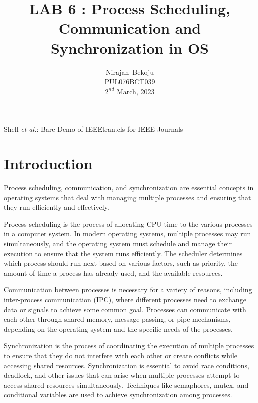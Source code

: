 \documentclass[journal,onecolumn]{IEEEtran}
\begin{document}
\title{LAB 6 : Process Scheduling, Communication and Synchronization in OS}

\author{Nirajan~Bekoju \\ PUL076BCT039 \\ $2^{nd}$ March, 2023}

%
{Shell \MakeLowercase{\textit{et al.}}: Bare Demo of IEEEtran.cls for IEEE Journals}

\maketitle

\IEEEpeerreviewmaketitle

\section{Introduction}
Process scheduling, communication, and synchronization are essential concepts in operating systems that deal with managing multiple processes and ensuring that they run efficiently and effectively.

Process scheduling is the process of allocating CPU time to the various processes in a computer system. In modern operating systems, multiple processes may run simultaneously, and the operating system must schedule and manage their execution to ensure that the system runs efficiently. The scheduler determines which process should run next based on various factors, such as priority, the amount of time a process has already used, and the available resources.

Communication between processes is necessary for a variety of reasons, including inter-process communication (IPC), where different processes need to exchange data or signals to achieve some common goal. Processes can communicate with each other through shared memory, message passing, or pipe mechanisms, depending on the operating system and the specific needs of the processes.

Synchronization is the process of coordinating the execution of multiple processes to ensure that they do not interfere with each other or create conflicts while accessing shared resources. Synchronization is essential to avoid race conditions, deadlock, and other issues that can arise when multiple processes attempt to access shared resources simultaneously. Techniques like semaphores, mutex, and conditional variables are used to achieve synchronization among processes.
\end{document}
